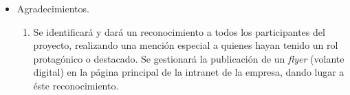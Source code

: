 \documentclass[
11pt, %
]{charter}
\begin{document}
\begin{itemize}
	\item Agradecimientos.
	\begin{enumerate}
		\item Se identificará y dará un reconocimiento a todos los participantes del proyecto, realizando una mención especial a quienes hayan tenido un rol protagónico o destacado. Se gestionará la publicación de un \textit{flyer} (volante digital) en la página principal de la intranet de la empresa, dando lugar a éste reconocimiento.
	\end{enumerate}


\end{itemize}

\end{document}
